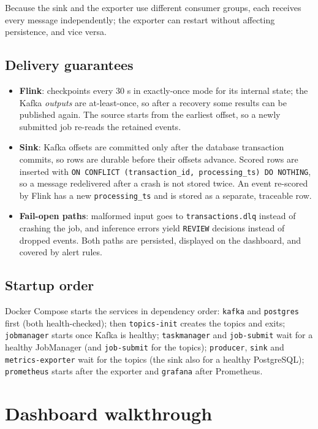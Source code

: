 \documentclass[11pt,a4paper]{article}
\newcommand{\code}[1]{\texttt{#1}}
\begin{document}
Because the sink and the exporter use different consumer groups, each receives
every message independently; the exporter can restart without affecting
persistence, and vice versa.

\subsection{Delivery guarantees}

\begin{itemize}
  \item \textbf{Flink}: checkpoints every 30 s in exactly-once mode for its
  internal state; the Kafka \emph{outputs} are at-least-once, so after a
  recovery some results can be published again. The source starts from the
  earliest offset, so a newly submitted job re-reads the retained events.
  \item \textbf{Sink}: Kafka offsets are committed only after the database
  transaction commits, so rows are durable before their offsets advance.
  Scored rows are inserted with \code{ON CONFLICT (transaction\_id,
  processing\_ts) DO NOTHING}, so a message redelivered after a crash is not
  stored twice. An event re-scored by Flink has a new \code{processing\_ts}
  and is stored as a separate, traceable row.
  \item \textbf{Fail-open paths}: malformed input goes to
  \code{transactions.dlq} instead of crashing the job, and inference errors
  yield \code{REVIEW} decisions instead of dropped events. Both paths are
  persisted, displayed on the dashboard, and covered by alert rules.
\end{itemize}

\subsection{Startup order}

Docker Compose starts the services in dependency order: \code{kafka} and
\code{postgres} first (both health-checked); then \code{topics-init} creates
the topics and exits; \code{jobmanager} starts once Kafka is healthy;
\code{taskmanager} and \code{job-submit} wait for a healthy JobManager (and
\code{job-submit} for the topics); \code{producer}, \code{sink} and
\code{metrics-exporter} wait for the topics (the sink also for a healthy
PostgreSQL); \code{prometheus} starts after the exporter and \code{grafana}
after Prometheus.

\section{Dashboard walkthrough}
\end{document}
